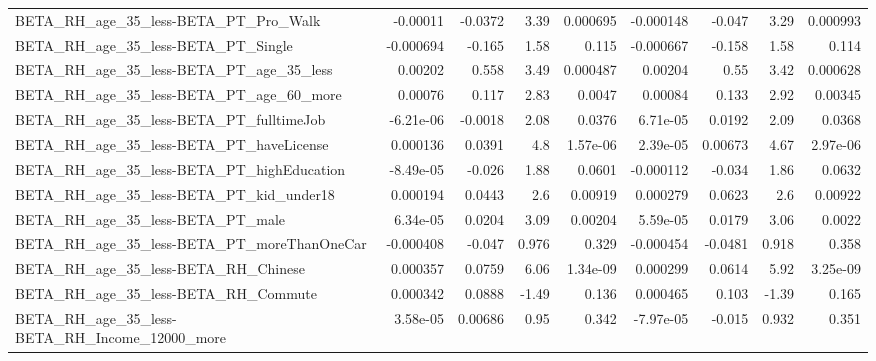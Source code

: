 \begin{tabular}{lrrrrrrrr}
BETA\_RH\_age\_35\_less-BETA\_PT\_Pro\_Walk               &    -0.00011 &      -0.0372 &      3.39 & 0.000695 &  -0.000148 &      -0.047 &         3.29 &      0.000993 \\
BETA\_RH\_age\_35\_less-BETA\_PT\_Single                 &   -0.000694 &       -0.165 &      1.58 &    0.115 &  -0.000667 &      -0.158 &         1.58 &         0.114 \\
BETA\_RH\_age\_35\_less-BETA\_PT\_age\_35\_less            &     0.00202 &        0.558 &      3.49 & 0.000487 &    0.00204 &        0.55 &         3.42 &      0.000628 \\
BETA\_RH\_age\_35\_less-BETA\_PT\_age\_60\_more            &     0.00076 &        0.117 &      2.83 &   0.0047 &    0.00084 &       0.133 &         2.92 &       0.00345 \\
BETA\_RH\_age\_35\_less-BETA\_PT\_fulltimeJob            &   -6.21e-06 &      -0.0018 &      2.08 &   0.0376 &   6.71e-05 &      0.0192 &         2.09 &        0.0368 \\
BETA\_RH\_age\_35\_less-BETA\_PT\_haveLicense            &    0.000136 &       0.0391 &       4.8 & 1.57e-06 &   2.39e-05 &     0.00673 &         4.67 &      2.97e-06 \\
BETA\_RH\_age\_35\_less-BETA\_PT\_highEducation          &   -8.49e-05 &       -0.026 &      1.88 &   0.0601 &  -0.000112 &      -0.034 &         1.86 &        0.0632 \\
BETA\_RH\_age\_35\_less-BETA\_PT\_kid\_under18            &    0.000194 &       0.0443 &       2.6 &  0.00919 &   0.000279 &      0.0623 &          2.6 &       0.00922 \\
BETA\_RH\_age\_35\_less-BETA\_PT\_male                   &    6.34e-05 &       0.0204 &      3.09 &  0.00204 &   5.59e-05 &      0.0179 &         3.06 &        0.0022 \\
BETA\_RH\_age\_35\_less-BETA\_PT\_moreThanOneCar         &   -0.000408 &       -0.047 &     0.976 &    0.329 &  -0.000454 &     -0.0481 &        0.918 &         0.358 \\
BETA\_RH\_age\_35\_less-BETA\_RH\_Chinese                &    0.000357 &       0.0759 &      6.06 & 1.34e-09 &   0.000299 &      0.0614 &         5.92 &      3.25e-09 \\
BETA\_RH\_age\_35\_less-BETA\_RH\_Commute                &    0.000342 &       0.0888 &     -1.49 &    0.136 &   0.000465 &       0.103 &        -1.39 &         0.165 \\
BETA\_RH\_age\_35\_less-BETA\_RH\_Income\_12000\_more      &    3.58e-05 &      0.00686 &      0.95 &    0.342 &  -7.97e-05 &      -0.015 &        0.932 &         0.351 \\

\end{tabular}

